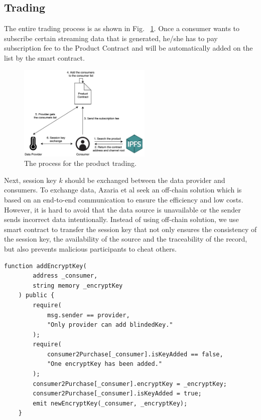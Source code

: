 \documentclass[conference]{IEEEtran}
\begin{document}
\subsection{Trading}
\label{section:trading}

The entire trading process is as shown in Fig.~ \ref{fig:trading_product}. Once a consumer wants to subscribe certain streaming data that is generated, he/she has to pay subscription fee to the Product Contract and will be automatically added on the list by the smart contract.

\begin{figure}[!t]
    \centering
    \includegraphics[width=2.5in]{trading_product}
    \caption{The process for the product trading.}
    \label{fig:trading_product}
\end{figure}

Next, session key $k$ should be exchanged between the data provider and consumers. To exchange data, Azaria et al\cite{Medrec} seek an off-chain solution which is based on an end-to-end communication to ensure the efficiency and low costs. However, it is hard to avoid that the data source is unavailable or the sender sends incorrect data intentionally. Instead of using off-chain solution, we use smart contract to transfer the session key\cite{3tierDataMarket} that not only ensures the consistency of the session key, the availability of the source and the traceability of the record, but also prevents malicious participants to cheat others.

\lstset{style=solidity}

\begin{lstlisting}[caption={Update encrypt key}, label={lst:key_exchange}, frame=single]
    function addEncryptKey(
        address _consumer,
        string memory _encryptKey
    ) public {
        require(
            msg.sender == provider,
            "Only provider can add blindedKey."
        );
        require(
            consumer2Purchase[_consumer].isKeyAdded == false,
            "One encryptKey has been added."
        );
        consumer2Purchase[_consumer].encryptKey = _encryptKey;
        consumer2Purchase[_consumer].isKeyAdded = true;
        emit newEncryptKey(_consumer, _encryptKey);
    }
\end{lstlisting}
\end{document}
